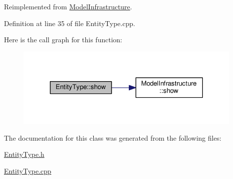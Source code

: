 Reimplemented from \hyperlink{class_model_infrastructure_a649a5a89a0c9931783d3c51de2acf266}{Model\-Infrastructure}.



Definition at line 35 of file Entity\-Type.\-cpp.



Here is the call graph for this function\-:\nopagebreak
\begin{figure}[H]
\begin{center}
\leavevmode
\includegraphics[width=312pt]{class_entity_type_ab5a696912b12a9f51decded90f368dea_cgraph}
\end{center}
\end{figure}




The documentation for this class was generated from the following files\-:\begin{DoxyCompactItemize}
\item 
\hyperlink{_entity_type_8h}{Entity\-Type.\-h}\item 
\hyperlink{_entity_type_8cpp}{Entity\-Type.\-cpp}\end{DoxyCompactItemize}
